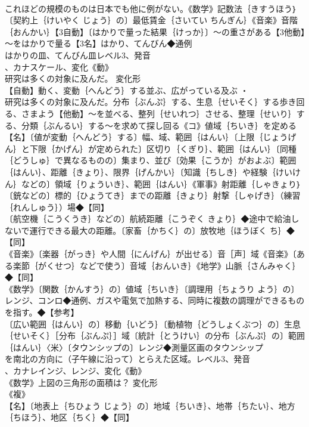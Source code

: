 \documentclass[8pt]{extreport}
\begin{document}
\begin{CJK}{UTF8}{min}
\\	これほどの規模のものは日本でも他に例がない。《数学》記数法｛きすうほう｝〔契約上｛けいやく じょう｝の〕最低賃金｛さいてい ちんぎん｝《音楽》音階｛おんかい｝【3自動】〔はかりで量った結果｛けっか｝〕～の重さがある【3他動】～をはかりで量る【3名】はかり、てんびん◆通例
\\	はかりの皿、てんびん皿レベル3、発音
\\	、カナスケール、変化《動》
\\	研究は多くの対象に及んだ。	変化形 
\\	【自動】動く、変動｛へんどう｝する並ぶ、広がっている及ぶ ・
\\	研究は多くの対象に及んだ。分布｛ぶんぷ｝する、生息｛せいそく｝する歩き回る、さまよう【他動】～を並べる、整列｛せいれつ｝させる、整理｛せいり｝する、分類｛ぶんるい｝する～を求めて探し回る《コ》値域｛ちいき｝を定める【名】〔値が変動｛へんどう｝する〕幅、域、範囲｛はんい｝〔上限｛じょうげん｝と下限｛かげん｝が定められた〕区切り｛くぎり｝、範囲｛はんい｝〔同種｛どうしゅ｝で異なるものの〕集まり、並び〔効果｛こうか｝がおよぶ〕範囲｛はんい｝、距離｛きょり｝、限界｛げんかい｝〔知識｛ちしき｝や経験｛けいけん｝などの〕領域｛りょういき｝、範囲｛はんい｝《軍事》射距離｛しゃきょり｝〔銃などの〕標的｛ひょうてき｝までの距離｛きょり｝射撃｛しゃげき｝（練習｛れんしゅう｝）場◆【同】
\\	〔航空機｛こうくうき｝などの〕航続距離｛こうぞく きょり｝◆途中で給油しないで運行できる最大の距離。〔家畜｛かちく｝の〕放牧地｛ほうぼく ち｝◆【同】
\\	《音楽》〔楽器｛がっき｝や人間｛にんげん｝が出せる〕音［声］域《音楽》〔ある楽節｛がくせつ｝などで使う〕音域｛おんいき｝《地学》山脈｛さんみゃく｝◆【同】
\\	《数学》〔関数｛かんすう｝の〕値域｛ちいき｝〔調理用｛ちょうり よう｝の〕レンジ、コンロ◆通例、ガスや電気で加熱する、同時に複数の調理ができるものを指す。◆【参考】
\\	〔広い範囲｛はんい｝の〕移動｛いどう｝〔動植物｛どうしょくぶつ｝の〕生息｛せいそく｝［分布｛ぶんぷ｝］域〔統計｛とうけい｝の分布｛ぶんぷ｝の〕範囲｛はんい｝〈米〉〔タウンシップの〕レンジ◆測量区画のタウンシップ
\\	を南北の方向に（子午線に沿って）とらえた区域。レベル3、発音
\\	、カナレインジ、レンジ、変化《動》
\\	《数学》上図の三角形の面積は？	変化形 
\\	《複》
\\	【名】〔地表上｛ちひょう じょう｝の〕地域｛ちいき｝、地帯｛ちたい｝、地方｛ちほう｝、地区｛ちく｝◆【同】

\end{CJK}
\end{document}
